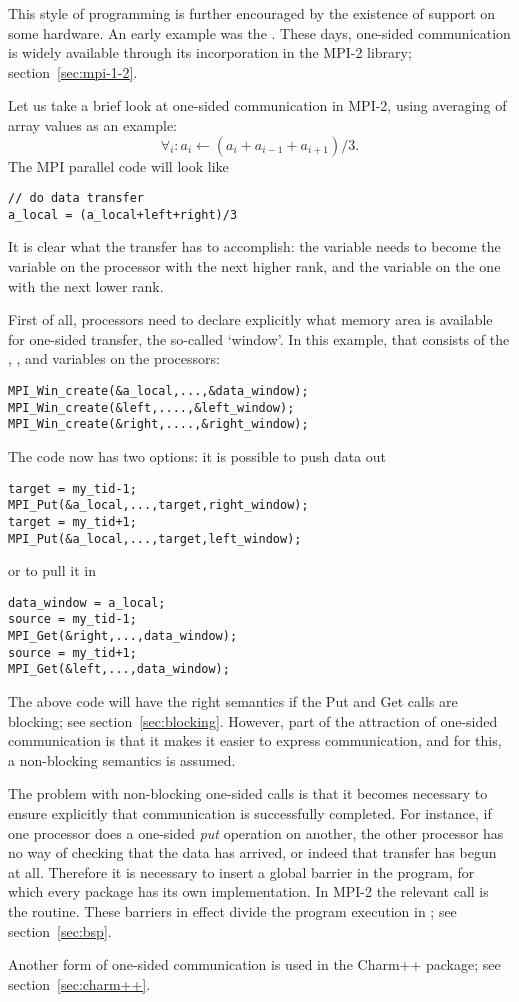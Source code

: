 This style of programming is further encouraged by the
existence of  support on some hardware. An early example was
the  . 
These days, one-sided communication is widely available through its
incorporation in the MPI-2 library; section~\ref{sec:mpi-1-2}.

Let us take a brief look at one-sided communication in MPI-2, using
averaging of array values as an example:
\[ \forall_i\colon a_i\leftarrow (a_i+a_{i-1}+a_{i+1})/3. \]
The MPI parallel code will look like
\begin{verbatim}
// do data transfer
a_local = (a_local+left+right)/3
\end{verbatim}
It is clear what the transfer has to accomplish: the 
variable needs to become the  variable on the processor with
the next higher rank, and the  variable on the one with the
next lower rank.

First of all, processors need to declare explicitly what memory area
is available for one-sided transfer, the so-called `window'. In this
example, that consists of the , , and 
variables on the processors:
\begin{verbatim}
MPI_Win_create(&a_local,...,&data_window);
MPI_Win_create(&left,....,&left_window);
MPI_Win_create(&right,....,&right_window);
\end{verbatim}
The code now has two options: it is possible to push data out
\begin{verbatim}
target = my_tid-1;
MPI_Put(&a_local,...,target,right_window);
target = my_tid+1;
MPI_Put(&a_local,...,target,left_window);
\end{verbatim}
or to pull it in
\begin{verbatim}
data_window = a_local;
source = my_tid-1;
MPI_Get(&right,...,data_window);
source = my_tid+1;
MPI_Get(&left,...,data_window);
\end{verbatim}
The above code will have the right semantics if the Put and Get calls
are blocking; see section~\ref{sec:blocking}. However, part of the
attraction of one-sided communication is that it makes it easier to
express communication, and for this, a non-blocking semantics is
assumed. 

The problem with non-blocking one-sided calls is that it becomes
necessary to ensure explicitly that communication is successfully
completed. For instance, if one processor does a one-sided \emph{put}
operation on another, the other processor has no way of checking that
the data has arrived, or indeed that transfer has begun at
all. Therefore it is necessary to insert a global barrier in the program,
for which every package has its own implementation. In MPI-2 the
relevant call is the 
 routine. These barriers in effect divide the program
execution in ; see section~\ref{sec:bsp}.

Another form of one-sided communication is used in the Charm++
package; see section~\ref{sec:charm++}.


